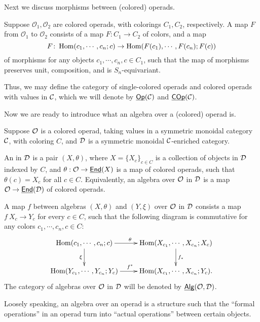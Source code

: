 \documentclass[twoside]{article}
\begin{document}
Next we discuss morphisms between (colored) operads.

\begin{definition}
    Suppose $\mathcal O_1,\mathcal O_2$ are colored operads,
    with colorings $C_1,C_2$, respectively. A map $F$ from $\mathcal O_1$ to 
    $\mathcal O_2$ consists of a map $F:C_1\to C_2$ of colors, and a map
    \[F\colon\operatorname{Hom}(c_1,\cdots,c_n;c)\to\operatorname{Hom}(F(c_1),\cdots,F(c_n);F(c))\] of morphisms
    for any objects $c_1,\cdots,c_n,c\in C_1$, such that the map of morphisms
    preserves unit, composition, and is $S_n$-equivariant.
\end{definition}

Thus, we may define the category of single-colored operads and colored operads
with values in $\cal C$, which we will denote by $\underline{\smash{\mathsf{Op}}}(\cal C)$ 
and $\underline{\smash{\mathsf{COp}}}(\cal C)$.

Now we are ready to introduce what an algebra over a (colored) operad is.

\begin{definition}
    Suppose $\cal O$ is a colored operad, taking values in a symmetric
    monoidal category $\cal C$, with coloring $C$, and $\cal D$ is a 
    symmetric monoidal $\cal C$-enriched category. 
    
    An 
    in $\cal D$ is a pair $(X,\theta)$, where $X=\{X_c\}_{c\in C}$ is a collection
    of objects in $\cal D$ indexed by $C$, and $\theta:\mathcal O\to\underline{\mathsf{End}}(X)$
    is a map of colored operads, such that $\theta(c)=X_c$ for all $c\in C$.
    Equivalently, an algebra over $\cal O$ in $\cal D$ is a map 
    $\mathcal O\to\underline{\mathsf{End}}(\cal D)$ of colored operads. 
    
    A map $f$ between algebras
    $(X,\theta)$ and $(Y,\xi)$ over $\cal O$ in $\cal D$ consists a map
    $f\:X_c\to Y_c$ for every $c\in C$, such that the following diagram
    is commutative for any colors $c_1,\cdots,c_n,c\in C$:
    \[\xymatrix{
    \Hom(c_1,\cdots,c_n;c)\ar[r]^\theta\ar[d]_\xi&\Hom(X_{c_1},\cdots,X_{c_n};X_c)
    \ar[d]^{f_*}\\\Hom(Y_{c_1},\cdots,Y_{c_n};Y_c)\ar[r]^{f^*}&
    \Hom(X_{c_1},\cdots,X_{c_n};Y_c).}\]
    The category of algebras over $\cal O$ in $\cal D$ will be denoted by
    $\underline{\smash{\mathsf{Alg}}}(\cal O,D)$.
\end{definition}

Loosely speaking, an algebra over an operad is a structure such that the
``formal operations'' in an operad turn into ``actual operations'' 
between certain objects.
\end{document}

